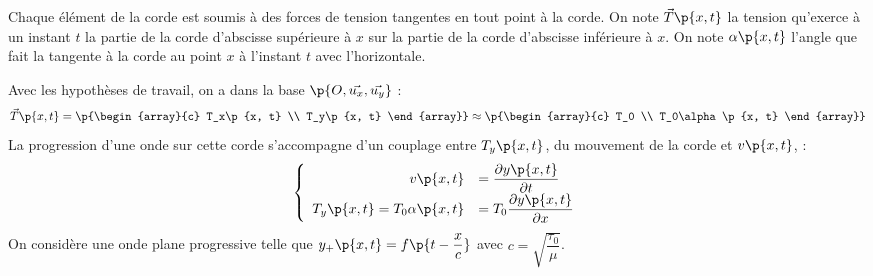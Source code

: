 \documentclass[a4paper,french,bookmarks]{article}
\begin{document}
    Chaque élément de la corde est soumis à des forces de tension tangentes en tout point à la corde. On note $\vec{T}\p{x, t}$ la tension qu'exerce à un instant $t$ la partie de la corde d'abscisse supérieure à $x$ sur la partie de la corde d'abscisse inférieure à $x$. On note $\alpha\p{x, t}$ l'angle que fait la tangente à la corde au point $x$ à l'instant $t$ avec l'horizontale.\medskip
    
    Avec les hypothèses de travail, on a dans la base $\p{O, \vec{u_x}, \vec{u_y}}$ :
    \[ \vec{T}\p{x, t} = \p{\begin{array}{c}
        T_x\p{x, t} \\
        T_y\p{x, t}
    \end{array}} \approx \p{\begin{array}{c}
        T_0 \\
        T_0\alpha\p{x, t}
    \end{array}}\]
    La progression d'une onde sur cette corde s'accompagne d'un couplage entre $T_y\p{x, t}$,  du mouvement de la corde et $v\p{x, t}$,  :
    \[ \left\lbrace\begin{array}{rl}
        v\p{x, t} &= \dfrac{\partial y\p{x, t}}{\partial t} \\[4pt]
        T_y\p{x, t} = T_0\alpha\p{x, t} &= T_0\dfrac{\partial y\p{x, t}}{\partial x} 
    \end{array}\right.\]
    On considère une onde plane progressive telle que $y_+\p{x, t} = f\p{t - \dfrac{x}{c}}$ avec $c = \sqrt{\dfrac{\tau_0}{\mu}}$.
    
\end{document}
